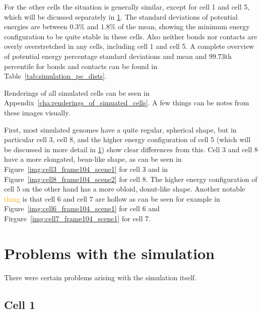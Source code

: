 For the other cells the situation is generally similar, except for cell 1 and cell 5, which will be dicussed separately in \ref{sec:problems_with_the_simulation}. The standard deviations of potential energies are between \(0.3\%\) and \(1.8\%\) of the mean, showing the minimum energy configuration to be quite stable in these cells. Also neither bonds nor contacts are overly overstretched in any cells, including cell 1 and cell 5. A complete overview of potential energy percentage standard deviations and mean and \(99.73\)th percentile for bonds and contacts can be found in Table~\ref{tab:simulation_pe_dists}.

Renderings of all simulated cells can be seen in Appendix~\ref{cha:renderings_of_simuated_cells}. A few things can be notes from these images visually.

First, most simulated genomes have a quite regular, spherical shape, but in particular cell 3, cell 8, and the higher energy configuration of cell 5 (which will be discussed in more detail in \ref{sec:problems_with_the_simulation}) show clear differences from this. Cell 3 and cell 8 have a more elongated, bean-like shape, as can be seen in Figure~\ref{img:cell3_frame104_scene1} for cell 3 and in Figure~\ref{img:cell8_frame104_scene2} for cell 8. The higher energy configuration of cell 5 on the other hand has a more obloid, donut-like shape. Another notable \textcolor{orange}{thing} is that cell 6 and cell 7 are hollow as can be seen for example in Figure~\ref{img:cell6_frame104_scene1} for cell 6 and Firgure~\ref{img:cell7_frame104_scene1} for cell 7.


\section{Problems with the simulation} %
\label{sec:problems_with_the_simulation}

There were certain problems arising with the simulation itself.

\subsection{Cell 1} %
\label{sub:cell_1}

